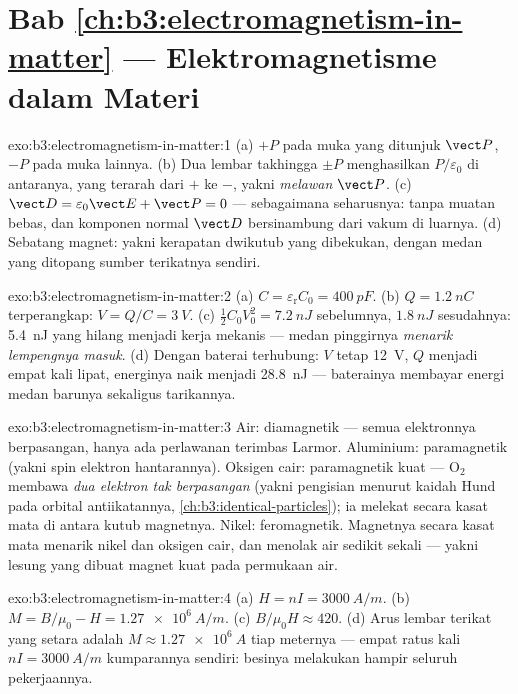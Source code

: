\section*{Bab \ref{ch:b3:electromagnetism-in-matter} --- Elektromagnetisme dalam Materi}

\begin{solution}{exo:b3:electromagnetism-in-matter:1}
(a) $+P$ pada muka yang ditunjuk $\vect P$, $-P$ pada muka lainnya. (b)
Dua lembar takhingga $\pm P$ menghasilkan $P/\varepsilon_0$ di antaranya,
yang terarah dari $+$ ke $-$, yakni \emph{melawan} $\vect P$. (c)
$\vect D = \varepsilon_0\vect E + \vect P = 0$ --- sebagaimana seharusnya:
tanpa muatan bebas, dan komponen normal $\vect D$ bersinambung dari
vakum di luarnya. (d) Sebatang magnet: yakni kerapatan dwikutub yang
dibekukan, dengan medan yang ditopang sumber terikatnya sendiri.
\end{solution}

\begin{solution}{exo:b3:electromagnetism-in-matter:2}
(a) $C = \varepsilon_{\text{r}}C_0 = \qty{400}{pF}$. (b) $Q =
\qty{1.2}{nC}$ terperangkap: $V = Q/C = \qty{3}{V}$. (c)
$\tfrac12C_0V_0^2 = \qty{7.2}{nJ}$ sebelumnya, $\qty{1.8}{nJ}$ sesudahnya:
\qty{5.4}{nJ} yang hilang menjadi kerja mekanis --- medan pinggirnya
\emph{menarik lempengnya masuk}. (d) Dengan baterai terhubung: $V$ tetap
\qty{12}{V}, $Q$ menjadi empat kali lipat, energinya naik menjadi \qty{28.8}{nJ} ---
baterainya membayar energi medan barunya sekaligus tarikannya.
\end{solution}

\begin{solution}{exo:b3:electromagnetism-in-matter:3}
Air: diamagnetik --- semua elektronnya berpasangan, hanya ada
perlawanan terimbas Larmor. Aluminium: paramagnetik (yakni spin elektron hantarannya).
Oksigen cair: paramagnetik kuat --- O$_2$ membawa \emph{dua
elektron tak berpasangan} (yakni pengisian menurut kaidah Hund pada
orbital antiikatannya, \cref{ch:b3:identical-particles}); ia melekat
secara kasat mata di antara kutub magnetnya. Nikel: feromagnetik. Magnetnya secara kasat mata
menarik nikel dan oksigen cair, dan menolak air sedikit sekali
--- yakni lesung yang dibuat magnet kuat pada permukaan air.
\end{solution}

\begin{solution}{exo:b3:electromagnetism-in-matter:4}
(a) $H = nI = \qty{3000}{A/m}$. (b) $M = B/\mu_0 - H =
\qty{1.27e6}{A/m}$. (c) $B/\mu_0H \approx 420$. (d) Arus lembar
terikat yang setara adalah $M \approx \qty{1.27e6}{A}$ tiap
meternya --- empat ratus kali $nI = \qty{3000}{A/m}$ kumparannya sendiri:
besinya melakukan hampir seluruh pekerjaannya.
\end{solution}

